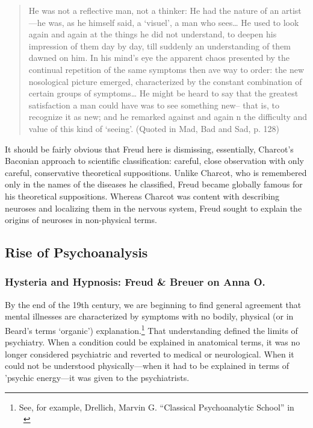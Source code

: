 \begin{refsection}
\begin{quote}
He was not a reflective man, not a thinker: He had the nature of an artist---he was, as he himself said, a `visuel', a man who sees{\ldots} He used to look again and again at the things he did not understand, to deepen his impression of them day by day, till suddenly an understanding of them dawned on him. In his mind's eye the apparent chaos presented by the continual repetition of the same symptoms then ave way to order: the new nosological picture emerged, characterized by the constant combination of certain groups of symptoms{\ldots} He might be heard to say that the greatest satisfaction a man could have was to see something new-- that is, to recognize it as new; and he remarked against and again n the difficulty and value of this kind of `seeing'. (Quoted in Mad, Bad and Sad, p. 128)
\end{quote}

It should be fairly obvious that Freud here is dismissing, essentially, Charcot's Baconian approach to scientific classification: careful, close observation with only careful, conservative theoretical suppositions. Unlike Charcot, who is remembered only in the names of the diseases he classified, Freud became globally famous for his theoretical suppositions. Whereas Charcot was content with describing neuroses and localizing them in the nervous system, Freud sought to explain the origins of neuroses in non-physical terms.

\subsection{Rise of Psychoanalysis}
\label{riseofpsychoanalysis}

\subsubsection{Hysteria and Hypnosis: Freud \& Breuer on Anna O.}
\label{hysteriaandhypnosis:freudbreueronannao.}

By the end of the 19th century, we are beginning to find general agreement that mental illnesses are characterized by symptoms with no bodily, physical (or in Beard's terms `organic') explanation.\footnote{See, for example, Drellich, Marvin G. ``Classical Psychoanalytic School'' in ~\citep{Arieti:1974tm}} That understanding defined the limits of psychiatry. When a condition could be explained in anatomical terms, it was no longer considered psychiatric and reverted to medical or neurological. When it could not be understood physically---when it had to be explained in terms of 'psychic energy---it was given to the psychiatrists.


\end{refsection}
